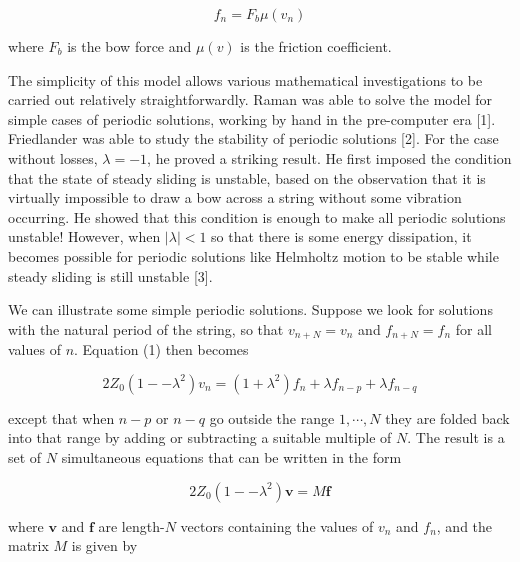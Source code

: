   \begin{equation*}f_n = F_b \mu(v_n) \tag{2}\end{equation*} 

  \noindent{}where $F_b$ is the bow force and $\mu(v)$ is the friction 
  coefficient. 

  The simplicity of this model allows various mathematical investigations to be 
  carried out relatively straightforwardly. Raman was able to solve the model 
  for simple cases of periodic solutions, working by hand in the pre-computer 
  era [1]. Friedlander was able to study the stability of periodic solutions 
  [2]. For the case without losses, $\lambda =-1$, he proved a striking result. 
  He first imposed the condition that the state of steady sliding is unstable, 
  based on the observation that it is virtually impossible to draw a bow across 
  a string without some vibration occurring. He showed that this condition is 
  enough to make all periodic solutions unstable! However, when $|\lambda| < 1$ 
  so that there is some energy dissipation, it becomes possible for periodic 
  solutions like Helmholtz motion to be stable while steady sliding is still 
  unstable [3]. 

  We can illustrate some simple periodic solutions. Suppose we look for 
  solutions with the natural period of the string, so that $v_{n+N}=v_n$ and 
  $f_{n+N}=f_n$ for all values of $n$. Equation (1) then becomes 

  \begin{equation*}2 Z_0 (1 -- \lambda^2) v_n = (1+ \lambda^2)f_n + \lambda 
  f_{n-p} + \lambda f_{n-q} \tag{3}\end{equation*} 

  \noindent{}except that when $n-p$ or $n-q$ go outside the range $1,\cdots,N$ 
  they are folded back into that range by adding or subtracting a suitable 
  multiple of $N$. The result is a set of $N$ simultaneous equations that can 
  be written in the form 

  \begin{equation*}2 Z_0 (1 -- \lambda^2) \mathbf{v} = M \mathbf{f} 
  \tag{4}\end{equation*} 

  \noindent{}where $\mathbf{v}$ and $\mathbf{f}$ are length-$N$ vectors 
  containing the values of $v_n$ and $f_n$, and the matrix $M$ is given by 

